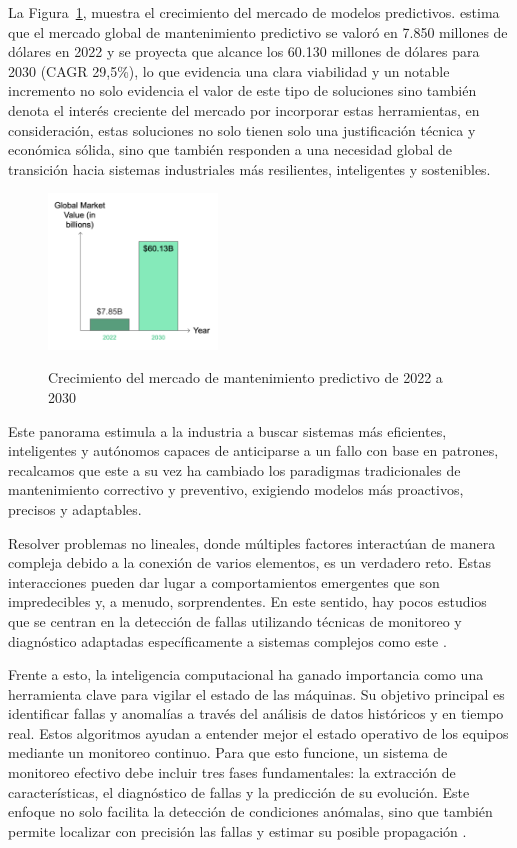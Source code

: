 \documentclass[11pt,a4paper,spanish]{book}
\numberwithin{equation}{chapter}
\numberwithin{figure}{chapter}
\begin{document}
La Figura~\ref{fig:figWorkTrek}, muestra el crecimiento del mercado de modelos predictivos.
\cite{worktrek2023predictive} estima que el mercado global de 
mantenimiento predictivo se valoró en 7.850 millones de dólares en 2022 y se proyecta 
que alcance los 60.130 millones de dólares para 2030 (CAGR 29,5\%), lo que evidencia 
una clara viabilidad y un notable incremento no solo evidencia el valor de este tipo de 
soluciones sino también denota el interés creciente del mercado por incorporar estas 
herramientas, en consideración, estas soluciones no solo tienen solo una  justificación 
técnica y económica sólida, sino que también responden a una necesidad global de 
transición hacia sistemas industriales más resilientes, inteligentes y sostenibles.


\begin{figure}[h]
    \caption{Crecimiento del mercado de mantenimiento predictivo de 2022 a 2030  
    \protect\cite{worktrek2023predictive}}
    \centering
    \includegraphics[width=0.4\textwidth]{media/worktrek.png}
    \label{fig:figWorkTrek}
\end{figure}


Este panorama estimula a la industria a buscar sistemas más eficientes, inteligentes y 
autónomos capaces de anticiparse a un fallo con base en patrones, recalcamos que este a 
su vez ha cambiado los paradigmas tradicionales de mantenimiento correctivo y preventivo,
exigiendo modelos más proactivos, precisos y adaptables.


Resolver problemas no lineales, donde múltiples factores interactúan de manera 
compleja debido a la conexión de varios elementos, es un verdadero reto. 
Estas interacciones pueden dar lugar a comportamientos emergentes que son impredecibles 
y, a menudo, sorprendentes. En este sentido, hay pocos estudios que se centran en la 
detección de fallas utilizando técnicas de monitoreo y diagnóstico adaptadas 
específicamente a sistemas complejos como este \cite{zhang2017overview}. 


Frente a esto, la inteligencia computacional ha ganado importancia como una herramienta 
clave para vigilar el estado de las máquinas. Su objetivo principal es identificar 
fallas y anomalías a través del análisis de datos históricos y en tiempo real. 
Estos algoritmos ayudan a entender mejor el estado operativo de los equipos mediante un 
monitoreo continuo. Para que esto funcione, un sistema de monitoreo efectivo debe 
incluir tres fases fundamentales: la extracción de características, el diagnóstico de 
fallas y la predicción de su evolución. Este enfoque no solo facilita la detección de 
condiciones anómalas, sino que también permite localizar con precisión las fallas y 
estimar su posible propagación \cite{randall2011vibration}.
\end{document}
